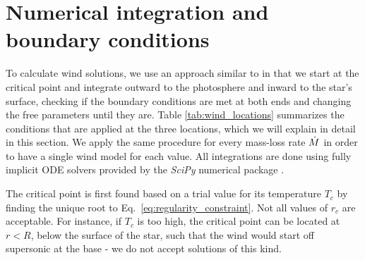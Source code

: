 \documentclass[../main.tex]{subfiles}
\begin{document}
\section{Numerical integration and boundary conditions}\label{sec:wind_numerical_method}
To calculate wind solutions, we use an approach similar to \citet{Paczynski1986b} in that we start at the critical point and integrate outward to the photosphere and inward to the star's surface, checking if the boundary conditions are met at both ends and changing the free parameters until they are. Table \ref{tab:wind_locations} summarizes the conditions that are applied at the three locations, which we will explain in detail in this section. We apply the same procedure for every mass-loss rate $\dot{M}$ in order to have a single wind model for each value.  All integrations are done using fully implicit ODE solvers provided by the \textit{SciPy} numerical package \citep{SciPy}. 

The critical point is first found based on a trial value for its temperature $T_c$ by finding the unique root to Eq.~\eqref{eq:regularity_constraint}. Not all values of $r_c$ are acceptable. For instance, if $T_c$ is too high, the critical point can be located at $r<R$, below the surface of the star, such that the wind would start off supersonic at the base - we do not accept solutions of this kind. 
\end{document}
